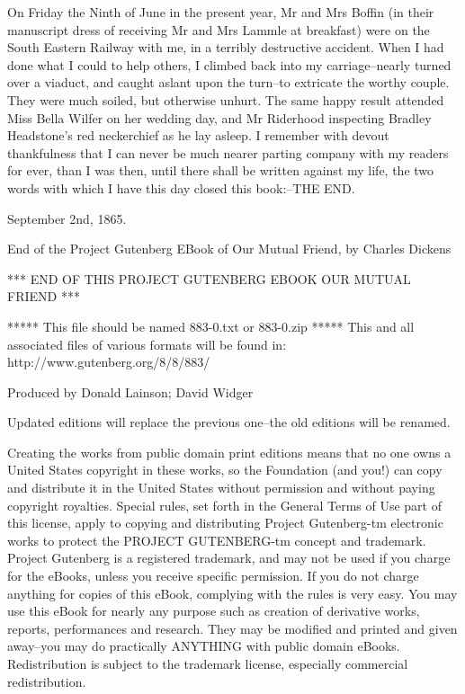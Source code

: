 On Friday the Ninth of June in the present year, Mr and Mrs Boffin (in
their manuscript dress of receiving Mr and Mrs Lammle at breakfast)
were on the South Eastern Railway with me, in a terribly destructive
accident. When I had done what I could to help others, I climbed back
into my carriage--nearly turned over a viaduct, and caught aslant upon
the turn--to extricate the worthy couple. They were much soiled, but
otherwise unhurt. The same happy result attended Miss Bella Wilfer on
her wedding day, and Mr Riderhood inspecting Bradley Headstone’s red
neckerchief as he lay asleep. I remember with devout thankfulness that I
can never be much nearer parting company with my readers for ever, than
I was then, until there shall be written against my life, the two words
with which I have this day closed this book:--THE END.

September 2nd, 1865.





End of the Project Gutenberg EBook of Our Mutual Friend, by Charles Dickens

*** END OF THIS PROJECT GUTENBERG EBOOK OUR MUTUAL FRIEND ***

***** This file should be named 883-0.txt or 883-0.zip *****
This and all associated files of various formats will be found in:
        http://www.gutenberg.org/8/8/883/

Produced by Donald Lainson; David Widger

Updated editions will replace the previous one--the old editions
will be renamed.

Creating the works from public domain print editions means that no
one owns a United States copyright in these works, so the Foundation
(and you!) can copy and distribute it in the United States without
permission and without paying copyright royalties.  Special rules,
set forth in the General Terms of Use part of this license, apply to
copying and distributing Project Gutenberg-tm electronic works to
protect the PROJECT GUTENBERG-tm concept and trademark.  Project
Gutenberg is a registered trademark, and may not be used if you
charge for the eBooks, unless you receive specific permission.  If you
do not charge anything for copies of this eBook, complying with the
rules is very easy.  You may use this eBook for nearly any purpose
such as creation of derivative works, reports, performances and
research.  They may be modified and printed and given away--you may do
practically ANYTHING with public domain eBooks.  Redistribution is
subject to the trademark license, especially commercial
redistribution.



